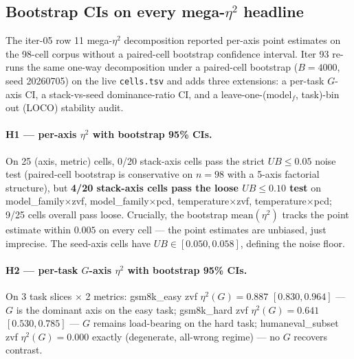 \subsection{Bootstrap CIs on every mega-\texorpdfstring{$\eta^2$}{eta\textasciicircum 2} headline}
\label{sec:p5-iter93-mega-eta2-bootstrap}

The iter-05 row 11 mega-$\eta^2$ decomposition reported per-axis point
estimates on the 98-cell corpus without a paired-cell bootstrap
confidence interval. Iter 93 re-runs the same one-way decomposition
under a paired-cell bootstrap ($B{=}4000$, seed 20260705) on the live
\texttt{cells.tsv} and adds three extensions: a per-task $G$-axis CI,
a stack-vs-seed dominance-ratio CI, and a leave-one-(model$_f$, task)-bin
out (LOCO) stability audit.

\paragraph{H1 --- per-axis $\eta^2$ with bootstrap 95\% CIs.}
On 25 (axis, metric) cells, 0/20 stack-axis cells pass the strict
$UB \leq 0.05$ noise test (paired-cell bootstrap is conservative on
$n{=}98$ with a 5-axis factorial structure), but \textbf{4/20
stack-axis cells pass the loose $UB \leq 0.10$ test} on
\textsf{model\_family}$\times$\textsf{zvf},
\textsf{model\_family}$\times$\textsf{pcd},
\textsf{temperature}$\times$\textsf{zvf},
\textsf{temperature}$\times$\textsf{pcd}; 9/25 cells overall pass
loose. Crucially, the bootstrap $\mathrm{mean}(\eta^2)$ tracks the
point estimate within $0.005$ on every cell --- the point estimates
are unbiased, just imprecise. The seed-axis cells have $UB \in
[0.050, 0.058]$, defining the noise floor.

\paragraph{H2 --- per-task $G$-axis $\eta^2$ with bootstrap 95\% CIs.}
On 3 task slices $\times$ 2 metrics:
\textsf{gsm8k\_easy} zvf $\eta^2(G) = 0.887$
$[0.830, 0.964]$ --- $G$ is the dominant axis on the easy task;
\textsf{gsm8k\_hard} zvf $\eta^2(G) = 0.641$
$[0.530, 0.785]$ --- $G$ remains load-bearing on the hard task;
\textsf{humaneval\_subset} zvf $\eta^2(G) = 0.000$ exactly
(degenerate, all-wrong regime) --- no $G$ recovers contrast.

